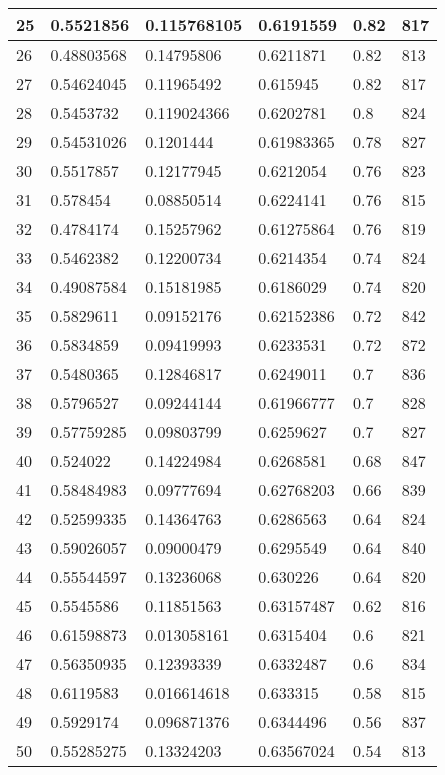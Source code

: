 \begin{longtable}{|l|l|l|l|l|l|}
25 & 0.5521856 & 0.115768105 & 0.6191559 & 0.82 & 817 \\ \hline 
26 & 0.48803568 & 0.14795806 & 0.6211871 & 0.82 & 813 \\ \hline 
27 & 0.54624045 & 0.11965492 & 0.615945 & 0.82 & 817 \\ \hline 
28 & 0.5453732 & 0.119024366 & 0.6202781 & 0.8 & 824 \\ \hline 
29 & 0.54531026 & 0.1201444 & 0.61983365 & 0.78 & 827 \\ \hline 
30 & 0.5517857 & 0.12177945 & 0.6212054 & 0.76 & 823 \\ \hline 
31 & 0.578454 & 0.08850514 & 0.6224141 & 0.76 & 815 \\ \hline 
32 & 0.4784174 & 0.15257962 & 0.61275864 & 0.76 & 819 \\ \hline 
33 & 0.5462382 & 0.12200734 & 0.6214354 & 0.74 & 824 \\ \hline 
34 & 0.49087584 & 0.15181985 & 0.6186029 & 0.74 & 820 \\ \hline 
35 & 0.5829611 & 0.09152176 & 0.62152386 & 0.72 & 842 \\ \hline 
36 & 0.5834859 & 0.09419993 & 0.6233531 & 0.72 & 872 \\ \hline 
37 & 0.5480365 & 0.12846817 & 0.6249011 & 0.7 & 836 \\ \hline 
38 & 0.5796527 & 0.09244144 & 0.61966777 & 0.7 & 828 \\ \hline 
39 & 0.57759285 & 0.09803799 & 0.6259627 & 0.7 & 827 \\ \hline 
40 & 0.524022 & 0.14224984 & 0.6268581 & 0.68 & 847 \\ \hline 
41 & 0.58484983 & 0.09777694 & 0.62768203 & 0.66 & 839 \\ \hline 
42 & 0.52599335 & 0.14364763 & 0.6286563 & 0.64 & 824 \\ \hline 
43 & 0.59026057 & 0.09000479 & 0.6295549 & 0.64 & 840 \\ \hline 
44 & 0.55544597 & 0.13236068 & 0.630226 & 0.64 & 820 \\ \hline 
45 & 0.5545586 & 0.11851563 & 0.63157487 & 0.62 & 816 \\ \hline 
46 & 0.61598873 & 0.013058161 & 0.6315404 & 0.6 & 821 \\ \hline 
47 & 0.56350935 & 0.12393339 & 0.6332487 & 0.6 & 834 \\ \hline 
48 & 0.6119583 & 0.016614618 & 0.633315 & 0.58 & 815 \\ \hline 
49 & 0.5929174 & 0.096871376 & 0.6344496 & 0.56 & 837 \\ \hline 
50 & 0.55285275 & 0.13324203 & 0.63567024 & 0.54 & 813 \\ \hline 
\end{longtable}